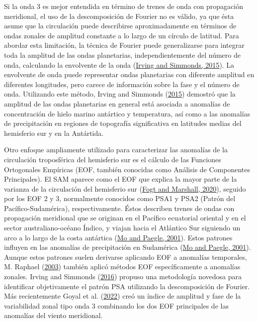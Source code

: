 \documentclass[12pt,oneside,a4paper]{reedthesis}
\begin{document}
Si la onda 3 es mejor entendida en término de trenes de onda con propagación meridional, el uso de la descomposición de Fourier no es válido, ya que ésta asume que la circulación puede describirse aproximadamente en términos de ondas zonales de amplitud constante a lo largo de un círculo de latitud.
Para abordar esta limitación, la técnica de Fourier puede generalizarse para integrar toda la amplitud de las ondas planetarias, independientemente del número de onda, calculando la envolvente de la onda (\protect\hyperlink{ref-irving2015}{Irving and Simmonds, 2015}).
La envolvente de onda puede representar ondas planetarias con diferente amplitud en diferentes longitudes, pero carece de información sobre la fase y el número de onda.
Utilizando este método, Irving and Simmonds (\protect\hyperlink{ref-irving2015}{2015}) demostró que la amplitud de las ondas planetarias en general está asociada a anomalías de concentración de hielo marino antártico y temperatura, así como a las anomalías de precipitación en regiones de topografía significativa en latitudes medias del hemisferio sur y en la Antártida.

Otro enfoque ampliamente utilizado para caracterizar las anomalías de la circulación troposférica del hemisferio sur es el cálculo de las Funciones Ortogonales Empíricas (EOF, también conocidas como Análisis de Componentes Principales).
El SAM aparece como el EOF que explica la mayor parte de la varianza de la circulación del hemisferio sur (\protect\hyperlink{ref-fogt2020}{Fogt and Marshall, 2020}), seguido por los EOF 2 y 3, normalmente conocidos como PSA1 y PSA2 (Patrón del Pacífico-Sudamérica), respectivamente.
Éstos describen trenes de ondas con propagación meridional que se originan en el Pacífico ecuatorial oriental y en el sector australiano-océano Índico, y viajan hacia el Atlántico Sur siguiendo un arco a lo largo de la costa antártica (\protect\hyperlink{ref-mo2001}{Mo and Paegle, 2001}).
Estos patrones influyen en las anomalías de precipitación en Sudamérica (\protect\hyperlink{ref-mo2001}{Mo and Paegle, 2001}).
Aunque estos patrones suelen derivarse aplicando EOF a anomalías temporales, M. Raphael (\protect\hyperlink{ref-raphael2003}{2003}) también aplicó métodos EOF específicamente a anomalías zonales.
Irving and Simmonds (\protect\hyperlink{ref-irving2016}{2016}) propuso una metodología novedosa para identificar objetivamente el patrón PSA utilizando la descomposición de Fourier.
Más recientemente Goyal et al. (\protect\hyperlink{ref-goyal2022}{2022}) creó un índice de amplitud y fase de la variabilidad zonal tipo onda 3 combinando los dos EOF principales de las anomalías del viento meridional.
\end{document}
